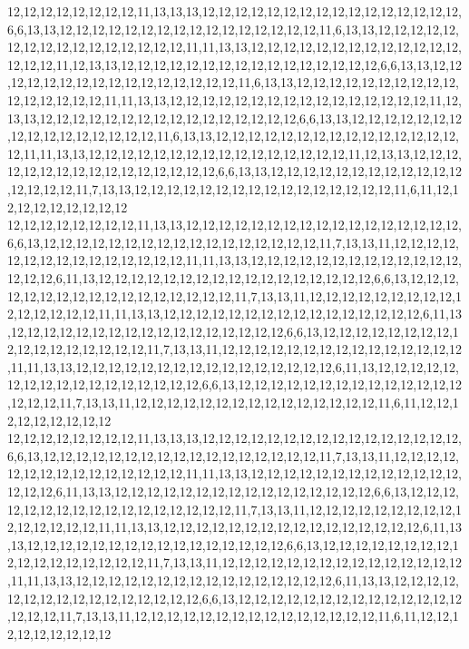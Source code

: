 12,12,12,12,12,12,12,12,11,13,13,13,12,12,12,12,12,12,12,12,12,12,12,12,12,12,12,12,6,6,13,13,12,12,12,12,12,12,12,12,12,12,12,12,12,12,12,12,11,6,13,13,12,12,12,12,12,12,12,12,12,12,12,12,12,12,12,12,11,11,13,13,12,12,12,12,12,12,12,12,12,12,12,12,12,12,12,12,11,12,13,13,12,12,12,12,12,12,12,12,12,12,12,12,12,12,12,12,6,6,13,13,12,12,12,12,12,12,12,12,12,12,12,12,12,12,12,12,11,6,13,13,12,12,12,12,12,12,12,12,12,12,12,12,12,12,12,12,11,11,13,13,12,12,12,12,12,12,12,12,12,12,12,12,12,12,12,12,11,12,13,13,12,12,12,12,12,12,12,12,12,12,12,12,12,12,12,12,6,6,13,13,12,12,12,12,12,12,12,12,12,12,12,12,12,12,12,12,11,6,13,13,12,12,12,12,12,12,12,12,12,12,12,12,12,12,12,12,11,11,13,13,12,12,12,12,12,12,12,12,12,12,12,12,12,12,12,12,11,12,13,13,12,12,12,12,12,12,12,12,12,12,12,12,12,12,12,12,6,6,13,13,12,12,12,12,12,12,12,12,12,12,12,12,12,12,12,12,11,7,13,13,12,12,12,12,12,12,12,12,12,12,12,12,12,12,12,12,11,6,11,12,12,12,12,12,12,12,12,12
12,12,12,12,12,12,12,12,11,13,13,12,12,12,12,12,12,12,12,12,12,12,12,12,12,12,12,12,6,6,13,12,12,12,12,12,12,12,12,12,12,12,12,12,12,12,12,12,11,7,13,13,11,12,12,12,12,12,12,12,12,12,12,12,12,12,12,12,11,11,13,13,12,12,12,12,12,12,12,12,12,12,12,12,12,12,12,12,6,11,13,12,12,12,12,12,12,12,12,12,12,12,12,12,12,12,12,12,6,6,13,12,12,12,12,12,12,12,12,12,12,12,12,12,12,12,12,12,11,7,13,13,11,12,12,12,12,12,12,12,12,12,12,12,12,12,12,12,11,11,13,13,12,12,12,12,12,12,12,12,12,12,12,12,12,12,12,12,6,11,13,12,12,12,12,12,12,12,12,12,12,12,12,12,12,12,12,12,6,6,13,12,12,12,12,12,12,12,12,12,12,12,12,12,12,12,12,12,11,7,13,13,11,12,12,12,12,12,12,12,12,12,12,12,12,12,12,12,11,11,13,13,12,12,12,12,12,12,12,12,12,12,12,12,12,12,12,12,6,11,13,12,12,12,12,12,12,12,12,12,12,12,12,12,12,12,12,12,6,6,13,12,12,12,12,12,12,12,12,12,12,12,12,12,12,12,12,12,11,7,13,13,11,12,12,12,12,12,12,12,12,12,12,12,12,12,12,12,11,6,11,12,12,12,12,12,12,12,12,12
12,12,12,12,12,12,12,12,11,13,13,13,12,12,12,12,12,12,12,12,12,12,12,12,12,12,12,12,6,6,13,12,12,12,12,12,12,12,12,12,12,12,12,12,12,12,12,12,11,7,13,13,11,12,12,12,12,12,12,12,12,12,12,12,12,12,12,12,11,11,13,13,12,12,12,12,12,12,12,12,12,12,12,12,12,12,12,12,6,11,13,13,12,12,12,12,12,12,12,12,12,12,12,12,12,12,12,12,6,6,13,12,12,12,12,12,12,12,12,12,12,12,12,12,12,12,12,12,11,7,13,13,11,12,12,12,12,12,12,12,12,12,12,12,12,12,12,12,11,11,13,13,12,12,12,12,12,12,12,12,12,12,12,12,12,12,12,12,6,11,13,13,12,12,12,12,12,12,12,12,12,12,12,12,12,12,12,12,6,6,13,12,12,12,12,12,12,12,12,12,12,12,12,12,12,12,12,12,11,7,13,13,11,12,12,12,12,12,12,12,12,12,12,12,12,12,12,12,11,11,13,13,12,12,12,12,12,12,12,12,12,12,12,12,12,12,12,12,6,11,13,13,12,12,12,12,12,12,12,12,12,12,12,12,12,12,12,12,6,6,13,12,12,12,12,12,12,12,12,12,12,12,12,12,12,12,12,12,11,7,13,13,11,12,12,12,12,12,12,12,12,12,12,12,12,12,12,12,11,6,11,12,12,12,12,12,12,12,12,12
